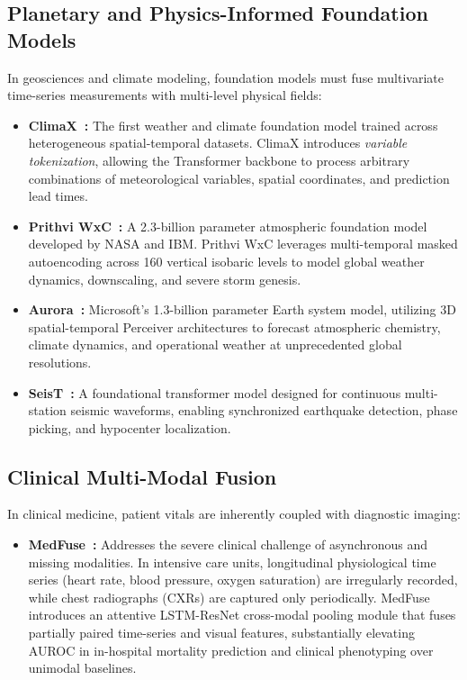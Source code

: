 \subsection{Planetary and Physics-Informed Foundation Models}
In geosciences and climate modeling, foundation models must fuse multivariate time-series measurements with multi-level physical fields:
\begin{itemize}
    \item \textbf{ClimaX~\cite{Nguyen2023ClimaX}:} The first weather and climate foundation model trained across heterogeneous spatial-temporal datasets. ClimaX introduces \textit{variable tokenization}, allowing the Transformer backbone to process arbitrary combinations of meteorological variables, spatial coordinates, and prediction lead times.
    \item \textbf{Prithvi WxC~\cite{Schmude2024PrithviWxC}:} A 2.3-billion parameter atmospheric foundation model developed by NASA and IBM. Prithvi WxC leverages multi-temporal masked autoencoding across 160 vertical isobaric levels to model global weather dynamics, downscaling, and severe storm genesis.
    \item \textbf{Aurora~\cite{Bodnar2024Aurora}:} Microsoft's 1.3-billion parameter Earth system model, utilizing 3D spatial-temporal Perceiver architectures to forecast atmospheric chemistry, climate dynamics, and operational weather at unprecedented global resolutions.
    \item \textbf{SeisT~\cite{Zhang2024SeisT}:} A foundational transformer model designed for continuous multi-station seismic waveforms, enabling synchronized earthquake detection, phase picking, and hypocenter localization.
\end{itemize}

\subsection{Clinical Multi-Modal Fusion}
In clinical medicine, patient vitals are inherently coupled with diagnostic imaging:
\begin{itemize}
    \item \textbf{MedFuse~\cite{Hayat2022MedFuse}:} Addresses the severe clinical challenge of asynchronous and missing modalities. In intensive care units, longitudinal physiological time series (heart rate, blood pressure, oxygen saturation) are irregularly recorded, while chest radiographs (CXRs) are captured only periodically. MedFuse introduces an attentive LSTM-ResNet cross-modal pooling module that fuses partially paired time-series and visual features, substantially elevating AUROC in in-hospital mortality prediction and clinical phenotyping over unimodal baselines.
\end{itemize}

